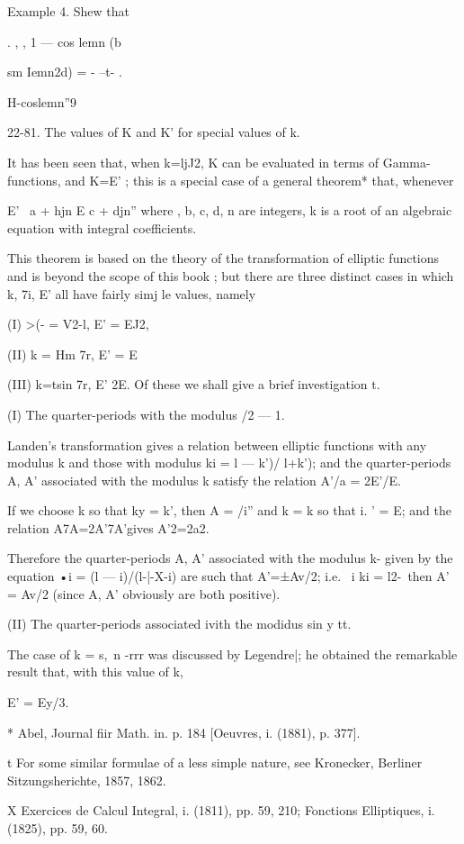 Example 4. Shew that 

. ,   , 1 — cos lemn  (b 

sm Iemn2d) = - --t- . 

H-coslemn''9 

22-81. The values of K and K' for special values of k. 

It has been seen that, when k=ljJ2, K can be evaluated in terms of Gamma-functions, 
and K=E' ; this is a special case of a general theorem* that, whenever 

E' \  a + hjn 
E c + djn'' 
where  , b, c, d, n are integers, k is a root of an algebraic equation with integral 
coefficients. 

This theorem is based on the theory of the transformation of elliptic functions and is 
beyond the scope of this book ; but there are three distinct cases in which k, 7i, E' all 
have fairly simj le values, namely 

(I) >(- = V2-l, E' = EJ2, 

(II) k = Hm 7r, E' = E %

(III) k=tsin 7r, E' 2E. 
Of these we shall give a brief investigation t. 

(I) The quarter-periods with the modulus  /2 — 1. 

Landen's transformation gives a relation between elliptic functions with any modulus k 
and those with modulus ki =  l — k')/ l+k'); and the quarter-periods A, A' associated with 
the modulus k  satisfy the relation A'/a = 2E'/E. 

If we choose k so that ky = k', then A = /i'' and k  = k so that i. ' = E; and the relation 
A7A=2A'7A'gives A'2=2a2. 

Therefore the quarter-periods A, A' associated with the modulus k-  given by the 
equation  •i = (l —  i)/(l-|-X-i) are such that A'=±Av/2; i.e. \ i ki =  l2-\, then A' = Av/2 
(since A, A' obviously are both positive). 

(II) The quarter-periods associated ivith the modidus sin y tt. 

The case of k = s,\ n -rrr was discussed by Legendre|; he obtained the remarkable 
result that, with this value of k, 

E' = Ey/3. 

* Abel, Journal fiir Math. in. p. 184 [Oeuvres, i. (1881), p. 377]. 

t For some similar formulae of a less simple nature, see Kronecker, Berliner Sitzungsherichte, 
1857, 1862. 

X Exercices de Calcul Integral, i. (1811), pp. 59, 210; Fonctions Elliptiques, i. (1825), 
pp. 59, 60. 



